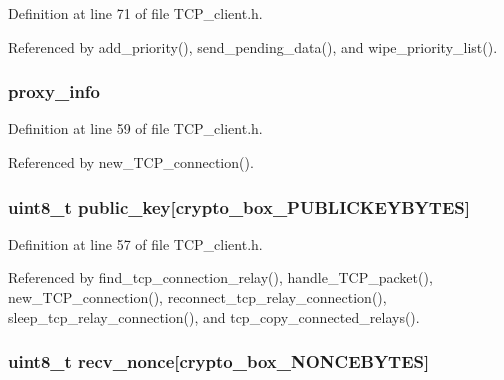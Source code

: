 Definition at line 71 of file T\+C\+P\+\_\+client.\+h.



Referenced by add\+\_\+priority(), send\+\_\+pending\+\_\+data(), and wipe\+\_\+priority\+\_\+list().

\hypertarget{struct_t_c_p___client___connection_aa737023350cf47e63993e3b4dc9a7472}{
\subsubsection[{proxy\+\_\+info}]{ proxy\+\_\+info}}\label{struct_t_c_p___client___connection_aa737023350cf47e63993e3b4dc9a7472}


Definition at line 59 of file T\+C\+P\+\_\+client.\+h.



Referenced by new\+\_\+\+T\+C\+P\+\_\+connection().

\hypertarget{struct_t_c_p___client___connection_aaa806bb1136fb3d4b5d8d8970b596ff7}{
\subsubsection[{public\+\_\+key}]{\setlength{\rightskip}{0pt plus 5cm}uint8\+\_\+t public\+\_\+key\mbox{[}crypto\+\_\+box\+\_\+\+P\+U\+B\+L\+I\+C\+K\+E\+Y\+B\+Y\+T\+E\+S\mbox{]}}}\label{struct_t_c_p___client___connection_aaa806bb1136fb3d4b5d8d8970b596ff7}


Definition at line 57 of file T\+C\+P\+\_\+client.\+h.



Referenced by find\+\_\+tcp\+\_\+connection\+\_\+relay(), handle\+\_\+\+T\+C\+P\+\_\+packet(), new\+\_\+\+T\+C\+P\+\_\+connection(), reconnect\+\_\+tcp\+\_\+relay\+\_\+connection(), sleep\+\_\+tcp\+\_\+relay\+\_\+connection(), and tcp\+\_\+copy\+\_\+connected\+\_\+relays().

\hypertarget{struct_t_c_p___client___connection_aae0467706f97aa3ef23e5dc9c3c199d7}{
\subsubsection[{recv\+\_\+nonce}]{\setlength{\rightskip}{0pt plus 5cm}uint8\+\_\+t recv\+\_\+nonce\mbox{[}crypto\+\_\+box\+\_\+\+N\+O\+N\+C\+E\+B\+Y\+T\+E\+S\mbox{]}}}\label{struct_t_c_p___client___connection_aae0467706f97aa3ef23e5dc9c3c199d7}


